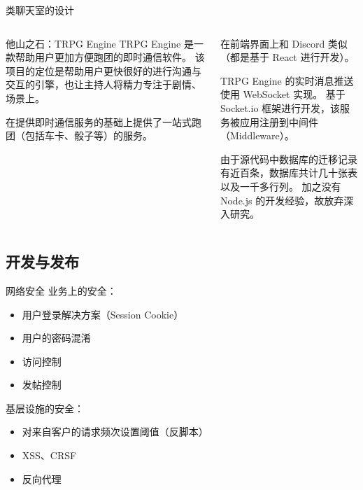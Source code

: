 \documentclass[UTF8]{ctexbeamer}
\begin{document}
\begin{frame}{类聊天室的设计}
\begin{columns}
\begin{column}{0.4\textwidth}
\begin{block}{他山之石：TRPG Engine}
TRPG Engine 是一款帮助用户更加方便跑团的即时通信软件。
该项目的定位是帮助用户更快很好的进行沟通与交互的引擎，也让主持人将精力专注于剧情、场景上。

在提供即时通信服务的基础上提供了一站式跑团（包括车卡、骰子等）的服务。
\end{block}
\end{column}
\begin{column}{0.5\textwidth}
在前端界面上和 Discord 类似（都是基于 React 进行开发）。

TRPG Engine 的实时消息推送使用 WebSocket 实现。
基于 Socket.io 框架进行开发，该服务被应用注册到中间件（Middleware）\footnotemark[1]。

由于源代码中数据库的迁移记录有近百条，数据库共计几十张表以及一千多行列。
加之没有 Node.js 的开发经验，故放弃深入研究。
\end{column}
\end{columns}
\end{frame}

\subsection{开发与发布}

\begin{frame}{网络安全}
业务上的安全：
\begin{itemize}
  \item 用户登录解决方案（Session Cookie）
  \item 用户的密码混淆
  \item 访问控制
  \item 发帖控制
\end{itemize}

基层设施的安全：
\begin{itemize}
  \item 对来自客户的请求频次设置阈值（反脚本）
  \item XSS、CRSF
  \item 反向代理
\end{itemize}
\end{frame}
\end{document}
